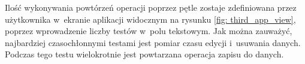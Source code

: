 Ilość wykonywania powtórzeń operacji poprzez pętle zostaje zdefiniowana przez użytkownika w~ekranie aplikacji widocznym na rysunku \ref{fig: third_app_view}, poprzez wprowadzenie liczby testów w~polu tekstowym. Jak można zauważyć, najbardziej czasochłonnymi testami jest pomiar czasu edycji i~usuwania danych. Podczas tego testu wielokrotnie jest powtarzana operacja zapisu do danych.